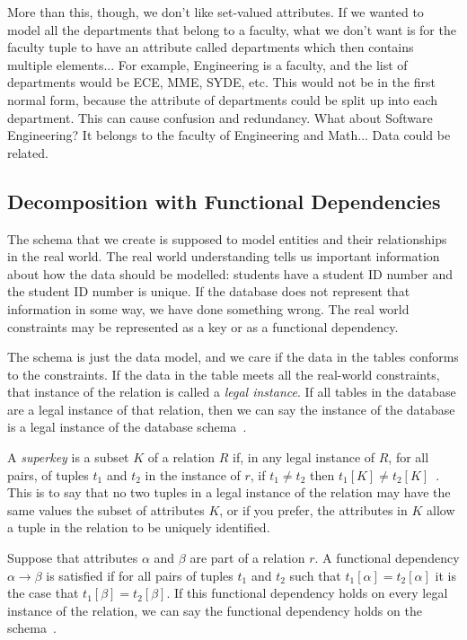 More than this, though, we don't like set-valued attributes. If we wanted to model all the departments that belong to a faculty, what we don't want is for the faculty tuple to have an attribute called departments which then contains multiple elements... For example, Engineering is a faculty, and the list of departments would be ECE, MME, SYDE, etc. This would not be in the first normal form, because the attribute of departments could be split up into each department. This can cause confusion and redundancy. What about Software Engineering? It belongs to the faculty of Engineering and Math... Data could be related.

\subsection*{Decomposition with Functional Dependencies}

The schema that we create is supposed to model entities and their relationships in the real world. The real world understanding tells us important information about how the data should be modelled: students have a student ID number and the student ID number is unique. If the database does not represent that information in some way, we have done something wrong. The real world constraints may be represented as a key or as a functional dependency.

The schema is just the data model, and we care if the data in the tables conforms to the constraints. If the data in the table meets all the real-world constraints, that instance of the relation is called a \textit{legal instance}. If all tables in the database are a legal instance of that relation, then we can say the instance of the database is a legal instance of the database schema~\cite{dsc}.

A \textit{superkey} is a subset $K$ of a relation $R$ if, in any legal instance of $R$, for all pairs, of tuples $t_{1}$ and $t_{2}$ in the instance of $r$, if $t_{1} \neq t_{2}$ then $t_{1}[K] \neq t_{2}[K]$~\cite{dsc}. This is to say that no two tuples in a legal instance of the relation may have the same values the subset of attributes $K$, or if you prefer, the attributes in $K$ allow a tuple in the relation to be uniquely identified.

Suppose that attributes $\alpha$ and $\beta$ are part of a relation $r$. A functional dependency $\alpha \rightarrow \beta$ is satisfied if for all pairs of tuples $t_{1}$ and $t_{2}$ such that $t_{1}[\alpha] = t_{2}[\alpha]$ it is the case that $t_{1}[\beta] = t_{2}[\beta]$. If this functional dependency holds on every legal instance of the relation, we can say the functional dependency holds on the schema~\cite{dsc}.

